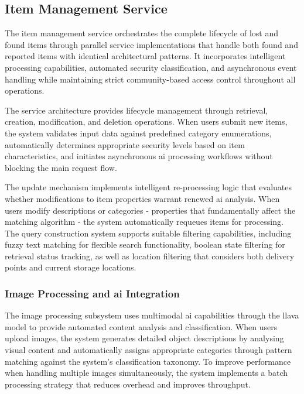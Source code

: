 \subsection{Item Management Service} \label{subsection:item_management_service}

The item management service orchestrates the complete lifecycle of lost and found items through parallel service implementations that handle both found and reported items with identical architectural patterns. It incorporates intelligent processing capabilities, automated security classification, and asynchronous event handling while maintaining strict community-based access control throughout all operations.

The service architecture provides lifecycle management through retrieval, creation, modification, and deletion operations. When users submit new items, the system validates input data against predefined category enumerations, automatically determines appropriate security levels based on item characteristics, and initiates asynchronous \ac{ai} processing workflows without blocking the main request flow.

The update mechanism implements intelligent re-processing logic that evaluates whether modifications to item properties warrant renewed \ac{ai} analysis. When users modify descriptions or categories - properties that fundamentally affect the matching algorithm - the system automatically requeues items for processing. The query construction system supports suitable filtering capabilities, including fuzzy text matching for flexible search functionality, boolean state filtering for retrieval status tracking, as well as location filtering that considers both delivery points and current storage locations.

\subsubsection{Image Processing and \ac{ai} Integration}

The image processing subsystem uses multimodal \ac{ai} capabilities through the \ac{llava} model to provide automated content analysis and classification. When users upload images, the system generates detailed object descriptions by analysing visual content and automatically assigns appropriate categories through pattern matching against the system's classification taxonomy. To improve performance when handling multiple images simultaneously, the system implements a batch processing strategy that reduces overhead and improves throughput.

